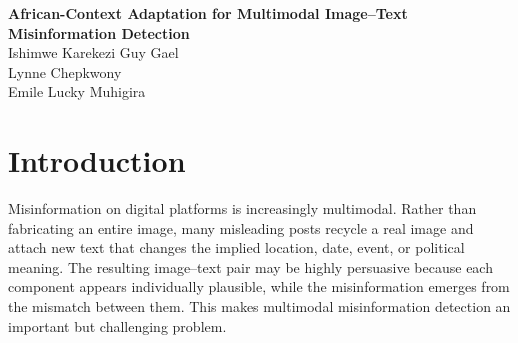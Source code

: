 \documentclass[a4paper,10.5pt,twoside]{article}
\begin{document}

\begin{center}
{\Large \textbf{African-Context Adaptation for Multimodal Image--Text Misinformation Detection}}\\[12pt]
{\normalsize
Ishimwe Karekezi Guy Gael\\
Lynne Chepkwony\\
Emile Lucky Muhigira
}
\end{center}

\begin{abstract}
Multimodal misinformation often appears as an authentic image paired with misleading text that reframes the event, place, or actors shown. This form of misinformation is difficult to catch with text-only or image-only systems because the deception lies in the relationship between the two modalities. In this project we study whether lightweight multimodal consistency features derived from a pretrained contrastive model can support misinformation detection in African media contexts, and whether adapting a benchmark-trained model with African-context data improves performance without harming the original benchmark. We combine CLIP-based image--text features with a logistic regression classifier, beginning with a Fakeddit baseline and extending the evaluation to a manually curated African-context dataset of 178 local image--text examples. We compare four views of the same pipeline: baseline performance on Fakeddit, direct transfer from Fakeddit to Africa before adaptation, adapted performance on an unseen African holdout, and the adapted model's performance on the original Fakeddit test set.

The final system yields strong in-domain performance on Fakeddit and shows that African-context adaptation improves target-domain behavior in the metrics most relevant to misinformation screening, especially misinformation recall and misinformation F1. At the same time, the adapted model remains strong on Fakeddit and even improves on the benchmark in the current configuration. These results suggest that benchmark-trained multimodal misinformation systems can benefit from targeted African adaptation, and that this adaptation can be achieved with a lightweight, explainable pipeline suitable for practical deployment in resource-constrained settings.
\end{abstract}

\section{Introduction}
Misinformation on digital platforms is increasingly multimodal. Rather than fabricating an entire image, many misleading posts recycle a real image and attach new text that changes the implied location, date, event, or political meaning. The resulting image--text pair may be highly persuasive because each component appears individually plausible, while the misinformation emerges from the mismatch between them. This makes multimodal misinformation detection an important but challenging problem.
\end{document}
